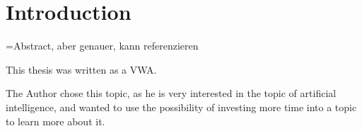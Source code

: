 \chapter{Introduction}
=Abstract, aber genauer, kann referenzieren

This thesis was written as a VWA.

The Author chose this topic, as he is very interested in the topic of artificial intelligence, and wanted to use the possibility of investing more time into a topic to learn more about it.


